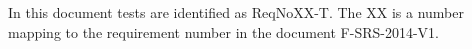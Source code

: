 In this document tests are identified as ReqNoXX-T. The XX is a number mapping to the requirement number in the document F-SRS-2014-V1. 
